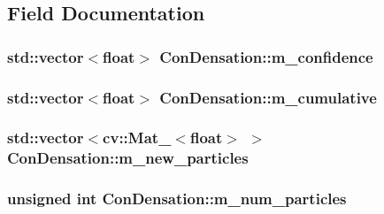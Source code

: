 \subsection{Field Documentation}
\hypertarget{classConDensation_abc5be0956acb4bd5c6383c4e095aac86}{
\subsubsection[{m\_\-confidence}]{\setlength{\rightskip}{0pt plus 5cm}std::vector$<$float$>$ {\bf ConDensation::m\_\-confidence}}}
\label{classConDensation_abc5be0956acb4bd5c6383c4e095aac86}
\hypertarget{classConDensation_a9062fce705b93a2ab93c114aa579943a}{
\subsubsection[{m\_\-cumulative}]{\setlength{\rightskip}{0pt plus 5cm}std::vector$<$float$>$ {\bf ConDensation::m\_\-cumulative}}}
\label{classConDensation_a9062fce705b93a2ab93c114aa579943a}
\hypertarget{classConDensation_a489443034896778939e5e24741d42728}{
\subsubsection[{m\_\-new\_\-particles}]{\setlength{\rightskip}{0pt plus 5cm}std::vector$<$cv::Mat\_\-$<$float$>$ $>$ {\bf ConDensation::m\_\-new\_\-particles}}}
\label{classConDensation_a489443034896778939e5e24741d42728}
\hypertarget{classConDensation_a6dd623ea8aa0fda252df3676dec562be}{
\subsubsection[{m\_\-num\_\-particles}]{\setlength{\rightskip}{0pt plus 5cm}unsigned int {\bf ConDensation::m\_\-num\_\-particles}}}
